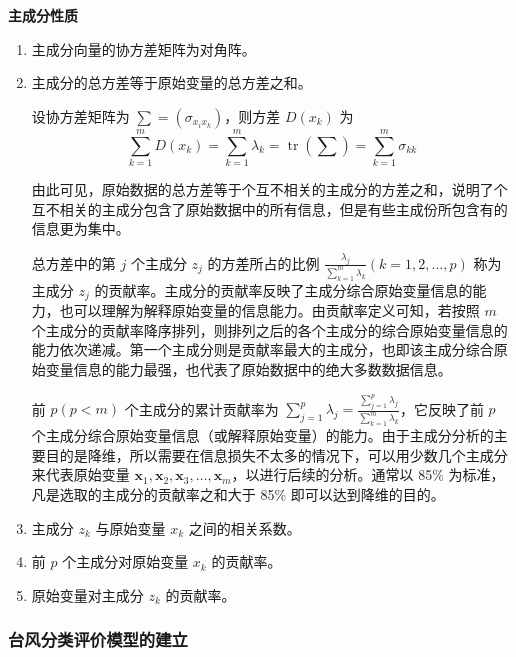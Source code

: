 \documentclass[withoutpreface,bwprint]{cumcmthesis}
\begin{document}
\vspace{1em}
\textbf{主成分性质}
\begin{enumerate}
    \setlength{\itemindent}{2em} %
    \item[a.] 主成分向量的协方差矩阵为对角阵。
    \item[b.] 主成分的总方差等于原始变量的总方差之和。

    设协方差矩阵为 $\sum = (\sigma_{x_i x_k})$，则方差 $D(x_k)$ 为
    \[
    \sum_{k=1}^m D(x_k) = \sum_{k=1}^m \lambda_k = \operatorname{tr}(\sum) = \sum_{k=1}^m \sigma_{kk}
    \]

    由此可见，原始数据的总方差等于个互不相关的主成分的方差之和，说明了个互不相关的主成分包含了原始数据中的所有信息，但是有些主成份所包含有的信息更为集中。

    总方差中的第 $j$ 个主成分 $z_j$ 的方差所占的比例 $\frac{\lambda_j}{\sum_{k=1}^m \lambda_k} (k = 1, 2, \dots, p)$ 称为主成分 $z_j$ 的贡献率。主成分的贡献率反映了主成分综合原始变量信息的能力，也可以理解为解释原始变量的信息能力。由贡献率定义可知，若按照 $m$ 个主成分的贡献率降序排列，则排列之后的各个主成分的综合原始变量信息的能力依次递减。第一个主成分则是贡献率最大的主成分，也即该主成分综合原始变量信息的能力最强，也代表了原始数据中的绝大多数数据信息。

    前 $p (p < m)$ 个主成分的累计贡献率为 $\sum_{j=1}^p \lambda_j = \frac{\sum_{j=1}^p \lambda_j}{\sum_{k=1}^m \lambda_k}$，它反映了前 $p$ 个主成分综合原始变量信息（或解释原始变量）的能力。由于主成分分析的主要目的是降维，所以需要在信息损失不太多的情况下，可以用少数几个主成分来代表原始变量 $\mathbf{x}_1, \mathbf{x}_2, \mathbf{x}_3, \dots, \mathbf{x}_m$，以进行后续的分析。通常以 85\% 为标准，凡是选取的主成分的贡献率之和大于 85\% 即可以达到降维的目的。

    \item[c.] 主成分 $z_{k}$ 与原始变量 $x_{k}$ 之间的相关系数。

    \item[d.] 前 $p$ 个主成分对原始变量 $x_{k}$ 的贡献率。

    \item[e.] 原始变量对主成分 $z_{k}$ 的贡献率。
\end{enumerate}

\subsubsection{台风分类评价模型的建立}
\end{document}
